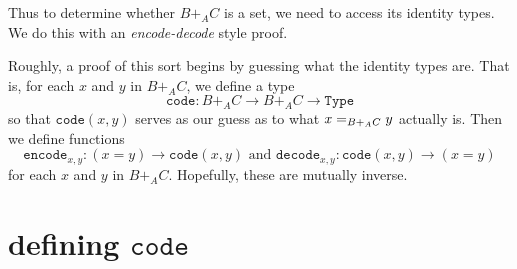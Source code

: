 \documentclass[12pt]{amsart}
\newcommand{\from}{\colon}
\newcommand{\type}[1]{\mathtt{#1}}
\newcommand{\Type}{\type{Type}}
\newcommand{\code}{\type{code}}
\theoremstyle{remark}
\theoremstyle{definition}
\begin{document}
Thus to determine whether $B +_A C$ is a set,
we need to access its identity types.  
We do this with an \emph{encode-decode} style proof.  

Roughly, a proof of this sort begins by guessing
what the identity types are.  That is,
for each $x$ and $y$ in $B +_A C$, 
we define a type 
\[
	\code \from B +_A C \to B +_A C \to \Type
\]
so that $\code(x,y)$ serves as our guess  
as to what $x =_{\scriptsize B +_A C} y$ actually is.  
Then we define functions
\[
	\type{ encode }_{ x , y } \from  ( x = y ) \to \code ( x , y ) 
	\text{ and }
	\type{ decode }_{ x , y } \from \code ( x , y ) \to ( x = y )
\]
for each $x$ and $y$ in $B +_A C$.  
Hopefully, these are mutually inverse.

\section{defining $\code$}
\end{document}
